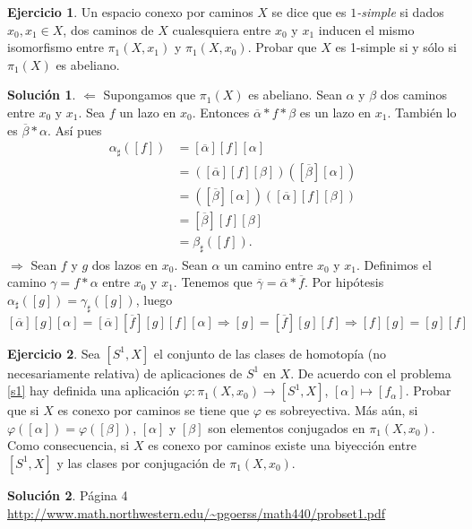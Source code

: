 \documentclass{article}
\theoremstyle{plain}
\theoremstyle{definition}
\newtheorem{exercise}{Ejercicio}
\newtheorem*{sol*}{Solución}
\begin{document}
\vspace{0.1cm}

\newpage \begin{exercise} Un espacio conexo por caminos $X$ se dice que es {\it $1$-simple} si
dados $x_0, x_1\in X$, dos caminos de $X$ cualesquiera entre $x_0$ y $x_1$ inducen el mismo
isomorfismo entre $\pi_1(X,x_1)$ y $\pi_1(X,x_0)$.
Probar que $X$ es 1-simple si y sólo si $\pi_1(X)$ es abeliano.
\end{exercise}
\begin{sol*}
$\boxed{\Leftarrow}$ Supongamos que $\pi_1(X)$ es abeliano. Sean $\alpha$ y $\beta$ dos caminos entre $x_0$ y $x_1$. Sea $f$ un lazo en $x_0$. Entonces $\overline{\alpha}*f*\beta$ es un lazo en $x_1$. También lo es $\overline{\beta}*\alpha$. Así pues
\begin{align*}
\alpha_\sharp([f])&=[\overline{\alpha}][f][\alpha]\\
				  &=([\overline{\alpha}][f][\beta])([\overline{\beta}][\alpha])\\
				  &=([\overline{\beta}][\alpha])([\overline{\alpha}][f][\beta])\\
				  &=[\overline{\beta}][f][\beta]\\
				  &=\beta_\sharp([f]).
\end{align*}
$\boxed{\Rightarrow}$ Sean $f$ y $g$ dos lazos en $x_0$. Sean $\alpha$ un camino entre $x_0$ y $x_1$. Definimos el camino $\gamma=f*\alpha$ entre $x_0$ y $x_1$. Tenemos que $\overline{\gamma}=\overline{\alpha}*\overline{f}$. Por hipótesis $\alpha_\sharp([g])=\gamma_\sharp([g])$, luego 
\[
[\overline{\alpha}][g][\alpha]=[\overline{\alpha}][\overline{f}][g][f][\alpha]\Rightarrow [g]=[\overline{f}][g][f]\Rightarrow [f][g]=[g][f]
\]
\end{sol*}

\newpage 
\begin{exercise}
Sea $[S^1,X]$ el conjunto de las clases de homotopía (no necesariamente relativa) de aplicaciones de $S^1$ en $X$. De acuerdo con el problema \ref{s1} hay definida una aplicación $\varphi: \pi_1(X,x_0) \to [S^1,X]$, $[\alpha] \mapsto [f_{\alpha}]$. Probar que si $X$ es conexo por caminos se tiene que $\varphi$ es sobreyectiva. Más aún, si $\varphi ([\alpha]) = \varphi([\beta])$, $[\alpha]$ y $[\beta]$ son elementos conjugados en $\pi_1(X,x_0)$.
Como consecuencia, si $X$ es conexo por caminos existe una biyección entre $[S^1,X]$ y las clases por conjugación de $\pi_1(X,x_0)$.
\end{exercise}
\begin{sol*}
Página 4 \url{http://www.math.northwestern.edu/~pgoerss/math440/probset1.pdf}
\end{sol*}
\end{document}
